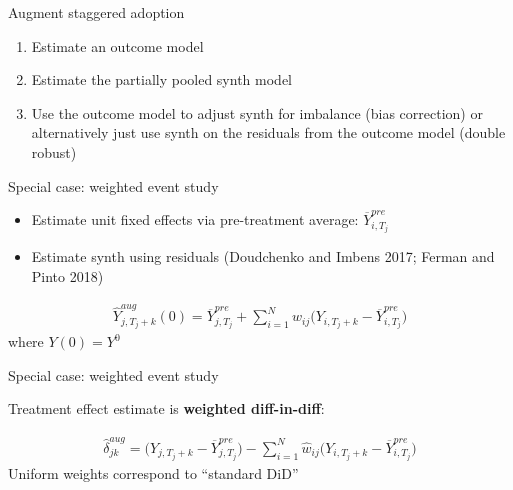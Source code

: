 \documentclass{beamer}
\begin{document}



\begin{frame}{Augment staggered adoption}

\begin{enumerate}
\item Estimate an outcome model
\item Estimate the partially pooled synth model
\item Use the outcome model to adjust synth for imbalance (bias correction) or alternatively just use synth on the residuals from the outcome model (double robust)
\end{enumerate}

\end{frame}

\begin{frame}{Special case: weighted event study}

\begin{itemize}
\item Estimate unit fixed effects via pre-treatment average: $\overline{Y}_{i,T_j}^{pre}$
\item Estimate synth using residuals (Doudchenko and Imbens 2017; Ferman and Pinto 2018)
\end{itemize}


\begin{eqnarray*}
\widehat{Y}^{aug}_{j,T_j+k}(0) = \overline{Y}_{j,T_j}^{pre} + \sum_{i=1}^N \widehat{w}_{ij} \bigg ( Y_{i,T_j+k} - \overline{Y}_{i,T_j}^{pre} \bigg )
\end{eqnarray*}where $Y(0)=Y^0$

\end{frame}

\begin{frame}{Special case: weighted event study}

Treatment effect estimate is \textbf{weighted diff-in-diff}:

\begin{eqnarray*}
\widehat{\delta}_{jk}^{aug} = \bigg ( Y_{j,T_j+k} - \overline{Y}_{j,T_j}^{pre} \bigg ) - \sum_{i=1}^N \widehat{w}_{ij} \bigg (Y_{i,T_j+k} - \overline{Y}_{i,T_j}^{pre} \bigg )
\end{eqnarray*}Uniform weights correspond to ``standard DiD''

\end{frame}
\end{document}

